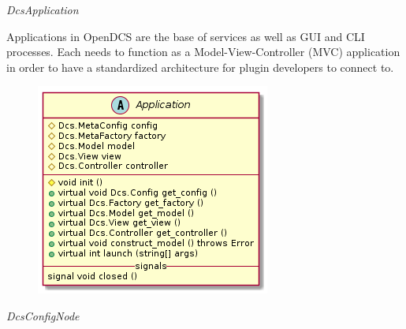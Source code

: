       \emph{DcsApplication}

      \vspace*{-0.75cm}
      \begin{minipage}[t]{0.5\textwidth}
        \vspace*{0.5cm}
        Applications in OpenDCS are the base of services as well as GUI and CLI
        processes. Each needs to function as a Model-View-Controller (MVC)
        application in order to have a standardized architecture for plugin
        developers to connect to.
      \end{minipage} \hfill
      \begin{minipage}[t]{0.45\textwidth}
        \begin{figure}[H]
          \includegraphics[width=\textwidth]{figures/design/class/core/application}
          \label{fig:dsg-classes-application}
        \end{figure}
      \end{minipage}

      \emph{DcsConfigNode}

